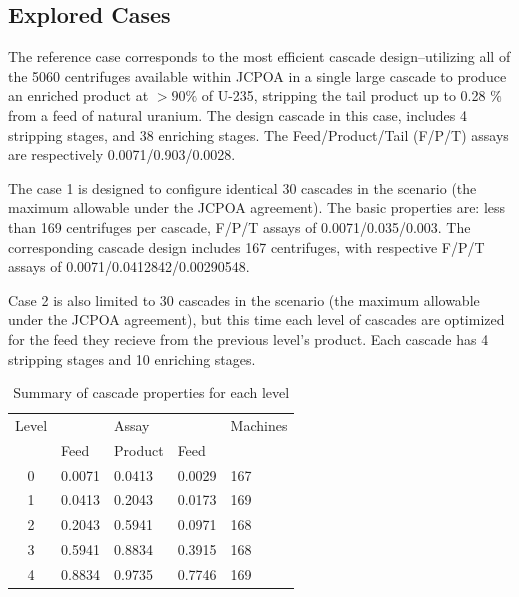 \documentclass{anstrans}
\begin{document}
\subsection{Explored Cases}

The reference case corresponds to the most efficient cascade design--utilizing all
of the 5060 centrifuges available within JCPOA in a single large cascade to produce an enriched product at
$>90\%$ of U-235, stripping the tail product up to 0.28 $\%$ from a feed of
natural uranium.  The design cascade in this case, includes 4 stripping stages,
and 38 enriching stages. The Feed/Product/Tail (F/P/T) assays are respectively
0.0071/0.903/0.0028.


The case 1 is designed to configure identical 30 cascades in the scenario (the maximum
allowable under the JCPOA agreement). The basic
properties are: less than 169 centrifuges per cascade, F/P/T assays of
0.0071/0.035/0.003. The corresponding cascade design includes 167 centrifuges, with
respective F/P/T assays of 0.0071/0.0412842/0.00290548.


Case 2 is also limited to 30 cascades in the scenario (the maximum allowable under
the JCPOA agreement), but this time each level of cascades are optimized for the feed they recieve from the previous level's product. Each cascade has 4 stripping stages and
10 enriching stages.

\begin{table}[htb]
\centering
  \caption{Summary of cascade properties for each level}
\begin{tabular}{cllll}
\toprule

Level   &           & Assay     &       & Machines  \\
        & Feed      & Product   & Feed  &           \\
\midrule
0       & 0.0071    & 0.0413    & 0.0029 & 167       \\
1       & 0.0413    & 0.2043    & 0.0173 & 169       \\
2       & 0.2043    & 0.5941    & 0.0971 & 168       \\
3       & 0.5941    & 0.8834    & 0.3915 & 168       \\
4       & 0.8834    & 0.9735    & 0.7746 & 169       \\

\bottomrule
\end{tabular}

  \label{tab:cascadelvl}
\end{table}
\end{document}
